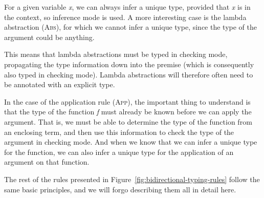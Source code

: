 \begin{figure}
\begin{center}
\usebox{\ptone}
\end{center}
\end{figure}
For a given variable \textit{x}, we can always infer a unique type, provided that \textit{x} is in the context, so inference mode is used. A more interesting case is the lambda abstraction (\textsc{Abs}), for which we cannot infer a unique type, since the type of the argument could be anything.
\begin{figure}
\begin{center}
\usebox{\pttwo}
\end{center}
\end{figure}
This means that lambda abstractions must be typed in checking mode, propagating the type information down into the premise (which is consequently also typed in checking mode). Lambda abstractions will therefore often need to be annotated with an explicit type. 
\begin{figure}
\begin{center}
\usebox{\ptthree}
\end{center}
\end{figure}
In the case of the application rule (\textsc{App}), the important thing to understand is that the type of the function \textit{f} must already be known before we can apply the argument. That is, we must be able to determine the type of the function from an enclosing term, and then use this information to check the type of the argument in checking mode. And when we know that we can infer a unique type for the function, we can also infer a unique type for the application of an argument on that function.

The rest of the rules presented in Figure~\ref{fig:bidirectional-typing-rules} follow the same basic principles, and we will forgo describing them all in detail here. 



\newsavebox{\ptPairElimOne}
\begin{lrbox}{\ptPairElimOne}
\begin{varwidth}{\linewidth}
\begin{prooftree}
\end{prooftree}
\end{varwidth}
\end{lrbox}

